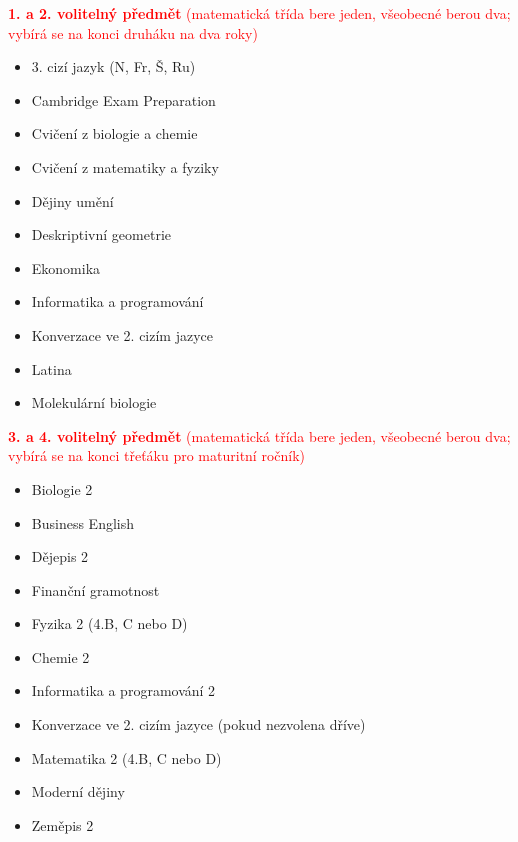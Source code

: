 \documentclass{article}
\begin{document}
\begin{multicols}{2}
\noindent \textcolor{red}{\textbf{1. a 2. volitelný předmět} (matematická třída bere jeden, všeobecné berou dva; vybírá se na konci druháku na dva roky)}
  \begin{itemize}
    \item 3. cizí jazyk (N, Fr, Š, Ru)
    \item Cambridge Exam Preparation
    \item Cvičení z biologie a chemie
    \item Cvičení z matematiky a fyziky
    \item Dějiny umění
    \item Deskriptivní geometrie
    \item Ekonomika
    \item Informatika a programování
    \item Konverzace ve 2. cizím jazyce
    \item Latina
    \item Molekulární biologie
  \end{itemize}

  \noindent \textcolor{red}{\textbf{3. a 4. volitelný předmět} (matematická třída bere jeden, všeobecné berou dva; vybírá se na konci třeťáku pro maturitní ročník)}
  \begin{itemize}
    \item Biologie 2
    \item Business English
    \item Dějepis 2
    \item Finanční gramotnost
    \item Fyzika 2 (4.B, C nebo D)
    \item Chemie 2
    \item Informatika a programování 2
    \item Konverzace ve 2. cizím jazyce
    (pokud nezvolena dříve)
    \item Matematika 2 (4.B, C nebo D)
    \item Moderní dějiny
    \item Zeměpis 2
  \end{itemize}

  \vfill\null

  \columnbreak


\end{multicols}
\end{document}
